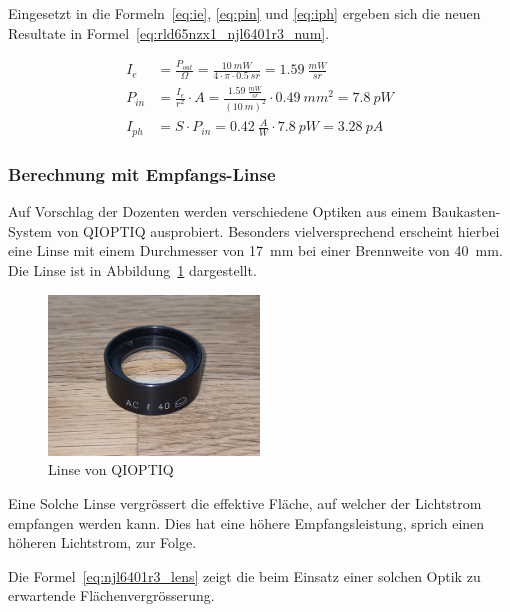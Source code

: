 Eingesetzt in die Formeln~\ref{eq:ie}, \ref{eq:pin} und \ref{eq:iph} ergeben sich die neuen Resultate in
Formel~\ref{eq:rld65nzx1_njl6401r3_num}.

\begin{equation}\label{eq:rld65nzx1_njl6401r3_num}
    \begin{split}
        I_e    &= \frac{P_{out}}{\Omega} = \frac{10~mW}{4\cdot \pi \cdot 0.5~sr} = 1.59~\frac{mW}{sr}\\
        P_{in} &= \frac{I_e}{r^2} \cdot A = \frac{1.59~\frac{mW}{sr}}{(10~m)^2} \cdot 0.49~mm^2 = 7.8~pW\\
        I_{ph} &= S \cdot P_{in} = 0.42~\frac{A}{W} \cdot 7.8~pW = 3.28~pA
    \end{split}
\end{equation}

\subsubsection{Berechnung mit Empfangs-Linse}

Auf Vorschlag der Dozenten werden verschiedene Optiken aus einem Baukasten-System von QIOPTIQ ausprobiert.
Besonders vielversprechend erscheint hierbei eine Linse mit einem Durchmesser von 17~mm bei einer Brennweite von
40~mm. Die Linse ist in Abbildung~\ref{fig:lens} dargestellt.

\begin{figure}[H]
    \centering
    \includegraphics[width=0.5\textwidth]{graphics/photo_lens.jpg}
    \caption{Linse von QIOPTIQ}\label{fig:lens}
\end{figure}

Eine Solche Linse vergrössert die effektive Fläche, auf welcher der Lichtstrom empfangen werden kann. Dies hat
eine höhere Empfangsleistung, sprich einen höheren Lichtstrom, zur Folge.

Die Formel~\ref{eq:njl6401r3_lens} zeigt die beim Einsatz einer solchen Optik zu erwartende Flächenvergrösserung.

